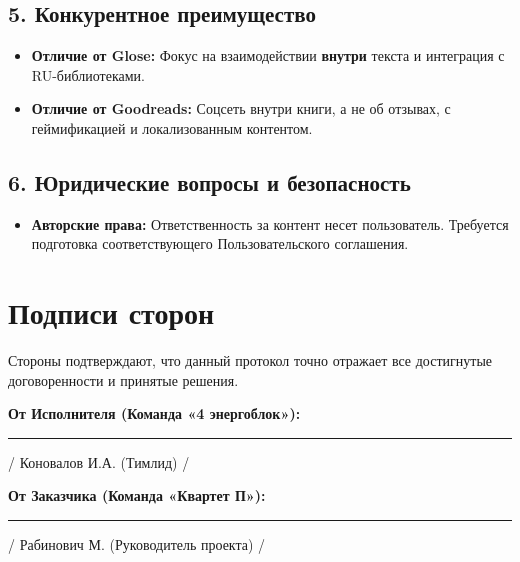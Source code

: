 \documentclass[12pt,a4paper]{article}
\begin{document}
\subsection*{5. Конкурентное преимущество}

\begin{itemize}
    \item \textbf{Отличие от Glose:} Фокус на взаимодействии \textbf{внутри} текста и интеграция с RU-библиотеками.
    \item \textbf{Отличие от Goodreads:} Соцсеть внутри книги, а не об отзывах, с геймификацией и локализованным контентом.
\end{itemize}

\subsection*{6. Юридические вопросы и безопасность}

\begin{itemize}
    \item \textbf{Авторские права:} Ответственность за контент несет пользователь. Требуется подготовка соответствующего Пользовательского соглашения.
\end{itemize}

\vspace{2cm}

\section*{Подписи сторон}

Стороны подтверждают, что данный протокол точно отражает все достигнутые договоренности и принятые решения.

\vspace{1cm}

\textbf{От Исполнителя (Команда «4 энергоблок»):}

\vspace{2cm}

\rule{5cm}{0.4pt} / Коновалов И.А. (Тимлид) /

\vspace{1cm}

\textbf{От Заказчика (Команда «Квартет П»):}

\vspace{2cm}

\rule{5cm}{0.4pt} / Рабинович М. (Руководитель проекта) /
\end{document}
